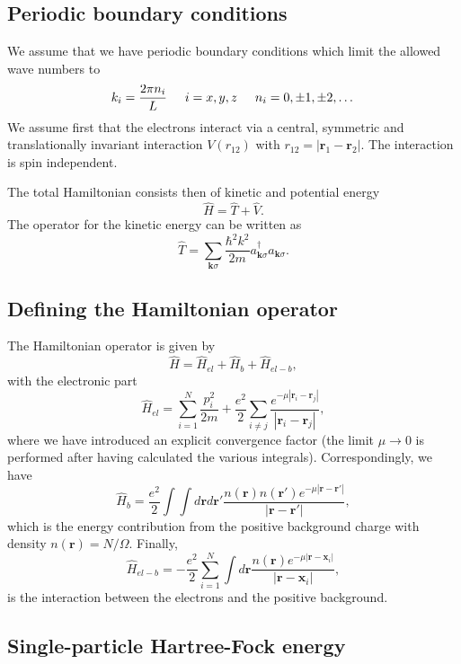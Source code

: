 \documentclass[%
oneside,                 %
final,                   %
10pt]{article}
\begin{document}
\subsection*{Periodic boundary conditions}


We assume that we have periodic boundary conditions which limit the allowed wave numbers to
\[
k_i=\frac{2\pi n_i}{L}\hspace{0.5cm} i=x,y,z \hspace{0.5cm} n_i=0,\pm 1,\pm 2, \dots
\]
We assume first that the electrons interact via a central, symmetric and translationally invariant
interaction  $V(r_{12})$ with
$r_{12}=|\mathbf{r}_1-\mathbf{r}_2|$.  The interaction is spin independent.

The total Hamiltonian consists then of kinetic and potential energy
\[
\hat{H} = \hat{T}+\hat{V}.
\]
The operator for the kinetic energy can be written as
\[
\hat{T}=\sum_{\mathbf{k}\sigma}\frac{\hbar^2k^2}{2m}a_{\mathbf{k}\sigma}^{\dagger}a_{\mathbf{k}\sigma}.
\]



\subsection*{Defining the Hamiltonian operator}

The Hamiltonian operator is given by
\[
\hat{H}=\hat{H}_{el}+\hat{H}_{b}+\hat{H}_{el-b},
\]
with the electronic part
\[
\hat{H}_{el}=\sum_{i=1}^N\frac{p_i^2}{2m}+\frac{e^2}{2}\sum_{i\ne j}\frac{e^{-\mu |\mathbf{r}_i-\mathbf{r}_j|}}{|\mathbf{r}_i-\mathbf{r}_j|},
\]
where we have introduced an explicit convergence factor
(the limit $\mu\rightarrow 0$ is performed after having calculated the various integrals).
Correspondingly, we have
\[
\hat{H}_{b}=\frac{e^2}{2}\int\int d\mathbf{r}d\mathbf{r}'\frac{n(\mathbf{r})n(\mathbf{r}')e^{-\mu |\mathbf{r}-\mathbf{r}'|}}{|\mathbf{r}-\mathbf{r}'|},
\]
which is the energy contribution from the positive background charge with density
$n(\mathbf{r})=N/\Omega$. Finally,
\[
\hat{H}_{el-b}=-\frac{e^2}{2}\sum_{i=1}^N\int d\mathbf{r}\frac{n(\mathbf{r})e^{-\mu |\mathbf{r}-\mathbf{x}_i|}}{|\mathbf{r}-\mathbf{x}_i|},
\]
is the interaction between the electrons and the positive background.



\subsection*{Single-particle Hartree-Fock energy}
\end{document}
